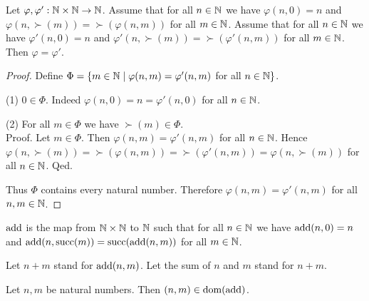 \documentclass[10pt]{article}
\begin{document}
  \begin{forthel}
    \begin{lemma}
      Let $\varphi, \varphi' : \mathbb{N} \times \mathbb{N} \to \mathbb{N}$.
      Assume that for all $n \in \mathbb{N}$ we have $\varphi(n,0) = n$ and
      $\varphi(n,\succ(m)) = \succ(\varphi(n,m))$ for all $m \in \mathbb{N}$.
      Assume that for all $n \in \mathbb{N}$ we have $\varphi'(n,0) = n$ and
      $\varphi'(n,\succ(m)) = \succ(\varphi'(n,m))$ for all $m \in \mathbb{N}$.
      Then $\varphi = \varphi'$.
    \end{lemma}
    \begin{proof}
      Define $\Phi = \{ m \in \mathbb{N} \mid \varphi(n,m) = \varphi'(n,m)$ for
      all $n \in \mathbb{N} \}$.

      (1) $0 \in \Phi$.
      Indeed $\varphi(n,0) = n = \varphi'(n,0)$ for all $n \in \mathbb{N}$.

      (2) For all $m \in \Phi$ we have $\succ(m) \in \Phi$. \\
      Proof.
        Let $m \in \Phi$.
        Then $\varphi(n,m) = \varphi'(n,m)$ for all $n \in \mathbb{N}$.
        Hence $\varphi(n, \succ(m))
          = \succ(\varphi(n,m))
          = \succ(\varphi'(n,m))
          = \varphi(n, \succ(m))$
        for all $n \in \mathbb{N}$.
      Qed.

      Thus $\Phi$ contains every natural number.
      Therefore $\varphi(n,m) = \varphi'(n,m)$ for all $n, m \in \mathbb{N}$.
    \end{proof}
  \end{forthel}

  \begin{forthel}
    \begin{definition}
      $\textrm{add}$ is the map from $\mathbb{N} \times \mathbb{N}$ to $\mathbb{N}$ such that for all
      $n \in \mathbb{N}$ we have $\textrm{add}(n,0) = n$ and $\textrm{add}(n,\textrm{succ}(m)) =
      \textrm{succ}(\textrm{add}(n,m))$ for all $m \in \mathbb{N}$.
    \end{definition}

    Let $n + m$ stand for $\textrm{add}(n,m)$.
    Let the sum of $n$ and $m$ stand for $n + m$.
  \end{forthel}

  \begin{forthel}
    \begin{lemma}
      Let $n, m$ be natural numbers.
      Then $(n,m) \in \operatorname{dom}(\textrm{add})$.
    \end{lemma}
  \end{forthel}
\end{document}
